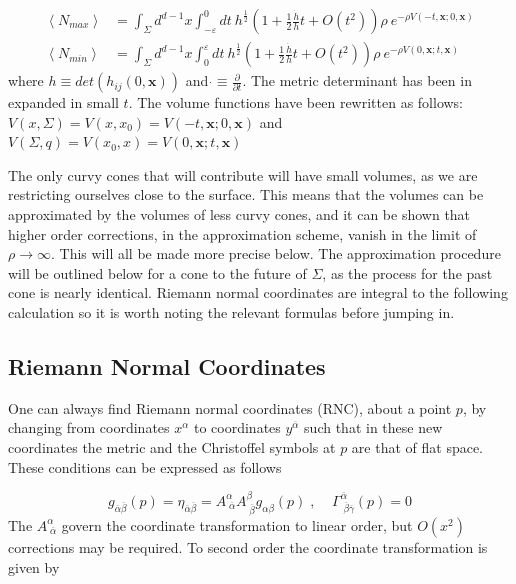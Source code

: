 \documentclass[12pt]{article}
\newcommand{\be}{\begin{equation}}
\newcommand{\ee}{\end{equation}}
\begin{document}
\begin{align}\label{eq:nmax_and_eq:nmin}
\left\langle N_{max}\right\rangle & =\int_{\Sigma}d^{d-1}x\int_{-\varepsilon}^{0}dt\:
h^{\frac{1}{2}}\left(1+
\frac{1}{2}\frac{\dot{h}}{h}t+O(t^2)\right)
 \rho\ e^{-\rho V(-t,\mathbf{x};0,\mathbf{x})}
\\
\left\langle N_{min}\right\rangle & =\int_{\Sigma}d^{d-1}x\int_{0}^{\varepsilon}dt\:
h^{\frac{1}{2}}\left(1+
\frac{1}{2}\frac{\dot{h}}{h}t+O(t^2)\right) \rho\ e^{-\rho V(0,\mathbf{x};t,\mathbf{x})}
\end{align}
where $h\equiv det\left(h_{ij}(0,\mathbf{x})\right)$ and $\dot{}\equiv \frac{\partial}{\partial t}$. The metric determinant has been in expanded in small $t$. The volume functions have been rewritten as follows: $V(x,\Sigma)=V(x,x_0)=V(-t,\mathbf{x};0,\mathbf{x})$ and $V(\Sigma,q)=V(x_0,x)=V(0,\mathbf{x};t,\mathbf{x})$

The only curvy cones that will contribute will have small volumes, as we are restricting ourselves close to the surface. This means that the volumes can be approximated by the volumes of less curvy cones, and it can be shown that higher order corrections, in the approximation scheme, vanish in the limit of $\rho \rightarrow \infty$. This will all be made more precise below. The approximation procedure will be outlined below for a cone to the future of $\Sigma$, as the process for the past cone is nearly identical. Riemann normal coordinates are integral to the following calculation so it is worth noting the relevant formulas before jumping in. 

\subsection{Riemann Normal Coordinates}

One can always find Riemann normal coordinates (RNC), about a point $p$, by changing from coordinates $x^{\alpha}$ to coordinates $y^{\overline{\alpha}}$ such that in these new coordinates the metric and the Christoffel symbols at $p$ are that of flat space. These conditions  can be expressed as follows

\be\label{eq:RNCMetricTransAtPAndChris}
g_{\overline{\alpha} \overline{\beta}}(p)=\eta_{\overline{\alpha} \overline{\beta}}=A^{\alpha}_{\;\overline{\alpha}}A^{\beta}_{\;\overline{\beta}}g_{\alpha\beta}(p)\;,\;\;\;\;\Gamma^{\overline{\alpha}}_{\;\overline{\beta}\overline{\gamma}}(p)=0
\ee
The $A^{\alpha}_{\;\overline{\alpha}}$ govern the coordinate transformation to linear order, but $O(x^2)$ corrections may be required. To second order the coordinate transformation is given by
\end{document}
